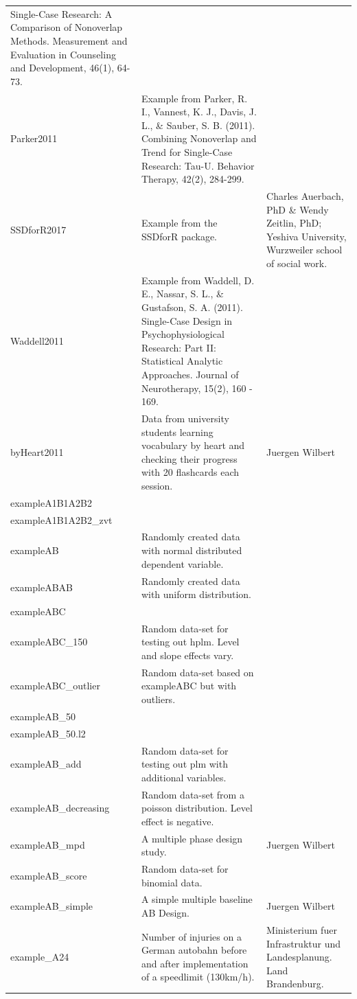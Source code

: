 \documentclass[
  letterpaper,
  DIV=11,
  numbers=noendperiod]{scrreprt}
\begin{document}
\begin{longtable}[]{@{}lll@{}}
Single-Case Research: A Comparison of Nonoverlap Methods. Measurement
and Evaluation in Counseling and Development, 46(1), 64-73. & \\
Parker2011 & Example from Parker, R. I., Vannest, K. J., Davis, J. L.,
\& Sauber, S. B. (2011). Combining Nonoverlap and Trend for Single-Case
Research: Tau-U. Behavior Therapy, 42(2), 284-299. & \\
SSDforR2017 & Example from the SSDforR package. & Charles Auerbach, PhD
\& Wendy Zeitlin, PhD; Yeshiva University, Wurzweiler school of social
work. \\
Waddell2011 & Example from Waddell, D. E., Nassar, S. L., \& Gustafson,
S. A. (2011). Single-Case Design in Psychophysiological Research: Part
II: Statistical Analytic Approaches. Journal of Neurotherapy, 15(2), 160
- 169. & \\
byHeart2011 & Data from university students learning vocabulary by heart
and checking their progress with 20 flashcards each session. & Juergen
Wilbert \\
exampleA1B1A2B2 & & \\
exampleA1B1A2B2\_zvt & & \\
exampleAB & Randomly created data with normal distributed dependent
variable. & \\
exampleABAB & Randomly created data with uniform distribution. & \\
exampleABC & & \\
exampleABC\_150 & Random data-set for testing out hplm. Level and slope
effects vary. & \\
exampleABC\_outlier & Random data-set based on exampleABC but with
outliers. & \\
exampleAB\_50 & & \\
exampleAB\_50.l2 & & \\
exampleAB\_add & Random data-set for testing out plm with additional
variables. & \\
exampleAB\_decreasing & Random data-set from a poisson distribution.
Level effect is negative. & \\
exampleAB\_mpd & A multiple phase design study. & Juergen Wilbert \\
exampleAB\_score & Random data-set for binomial data. & \\
exampleAB\_simple & A simple multiple baseline AB Design. & Juergen
Wilbert \\
example\_A24 & Number of injuries on a German autobahn before and after
implementation of a speedlimit (130km/h). & Ministerium fuer
Infrastruktur und Landesplanung. Land Brandenburg. \\
\bottomrule()
\end{longtable}
\end{document}

